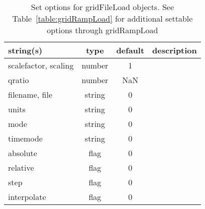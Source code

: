 \begin{table}[ht]
\centering
\begin{tabular}{p{5cm} c c p{7cm}}
\hline
string(s) & type & default & description \\
\hline
scalefactor, scaling & number & 1 & \\
qratio & number & NaN & \\
filename, file & string & 0 & \\
units & string & 0 & \\
mode & string & 0 & \\
timemode & string & 0 & \\
absolute & flag & 0 & \\
relative & flag & 0 & \\
step & flag & 0 & \\
interpolate & flag & 0 & \\
\hline
\end{tabular}
\caption{Set options for gridFileLoad objects. See Table~\ref{table:gridRampLoad} for additional settable options through gridRampLoad}
\label{table:gridFileLoad}
\end{table}

